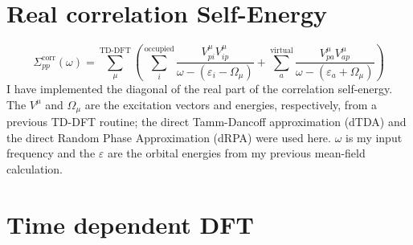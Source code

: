 \documentclass[12pt]{caltech_thesis}
\begin{document}
\section{Real correlation Self-Energy}
\begin{equation}
    \Sigma_{pp}^{\text{corr}}(\omega) = \sum_{\mu }^{\text{TD-DFT}}\left(\sum_{i}^{\text{occupied}} \frac{V_{pi}^{\mu }V_{ip}^{\mu }}{\omega -(\varepsilon _{i}-\Omega  _{\mu })}+ \sum_{a}^{\text{virtual}} \frac{V_{pa}^{\mu }V_{ap}^{\mu }}{\omega -(\varepsilon _{a}+\Omega  _{\mu })}\right)
\end{equation}
I have implemented the diagonal of the real part of the correlation self-energy. The $V^{\mu}$ and $\Omega_{\mu}$ are the excitation vectors and energies, respectively, from a previous TD-DFT routine; the direct Tamm-Dancoff approximation (dTDA) and the direct Random Phase Approximation (dRPA) were used here. $\omega$ is my input frequency and the $\varepsilon$ are the orbital energies from my previous mean-field calculation.



\section{Time dependent DFT}
\end{document}
